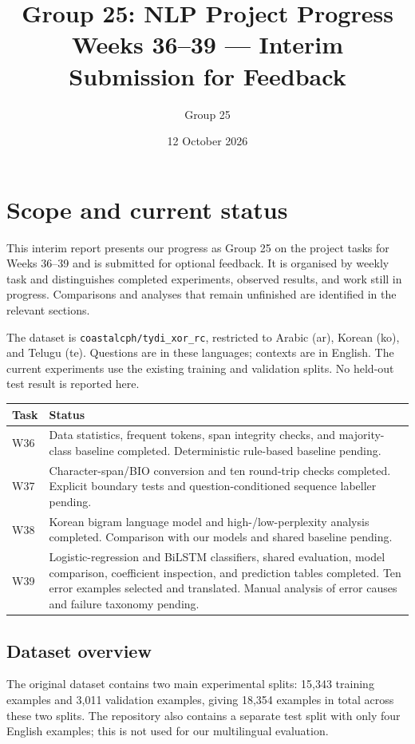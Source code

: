 \documentclass[11pt,a4paper]{article}
\title{Group 25: NLP Project Progress\\\large Weeks 36--39 --- Interim Submission for Feedback}
\author{Group 25}
\date{12 October 2026}
\begin{document}
\maketitle

\section{Scope and current status}
This interim report presents our progress as Group 25 on the project tasks for Weeks 36--39 and is submitted for optional feedback. It is organised by weekly task and distinguishes completed experiments, observed results, and work still in progress. Comparisons and analyses that remain unfinished are identified in the relevant sections.

The dataset is \texttt{coastalcph/tydi\_xor\_rc}, restricted to Arabic (ar), Korean (ko), and Telugu (te). Questions are in these languages; contexts are in English. The current experiments use the existing training and validation splits. No held-out test result is reported here.

\begin{center}
\begin{tabularx}{\linewidth}{lX}
\toprule
Task & Status \\
\midrule
W36 & Data statistics, frequent tokens, span integrity checks, and majority-class baseline completed. Deterministic rule-based baseline pending. \\
W37 & Character-span/BIO conversion and ten round-trip checks completed. Explicit boundary tests and question-conditioned sequence labeller pending. \\
W38 & Korean bigram language model and high-/low-perplexity analysis completed. Comparison with our models and shared baseline pending. \\
W39 & Logistic-regression and BiLSTM classifiers, shared evaluation, model comparison, coefficient inspection, and prediction tables completed. Ten error examples selected and translated. Manual analysis of error causes and failure taxonomy pending. \\
\bottomrule
\end{tabularx}
\end{center}

\subsection*{Dataset overview}

The original dataset contains two main experimental splits:
15,343 training examples and 3,011 validation examples,
giving 18,354 examples in total across these two splits.
The repository also contains a separate test split with only
four English examples; this is not used for our multilingual
evaluation.
\end{document}
